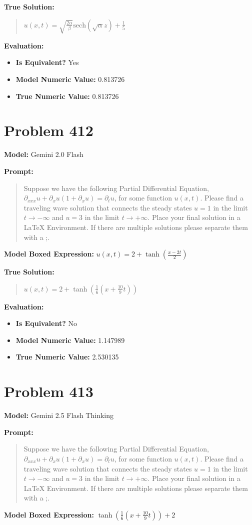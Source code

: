 \documentclass{article}
\begin{document}
\textbf{True Solution:}
\begin{quote}
$u(x,t) = \sqrt{\frac{2 \alpha}{\beta}}\text{sech}(\sqrt{\alpha} z) + \frac{1}{5}$
\end{quote}

\textbf{Evaluation:}
\begin{itemize}
\item \textbf{Is Equivalent?} Yes
\item \textbf{Model Numeric Value:} 0.813726
\item \textbf{True Numeric Value:} 0.813726
\end{itemize}
\vspace{1cm}
\section*{Problem 412}
\textbf{Model:} Gemini 2.0 Flash

\textbf{Prompt:}
\begin{quote}
Suppose we have the following Partial Differential Equation, $\partial_{xxx}u + \partial_xu(1+\partial_xu) = \partial_tu$, for some function $u(x,t)$. Please find a traveling wave solution that connects the steady states $u = 1$ in the limit $t \rightarrow -\infty $ and $u = 3$ in the limit $t \rightarrow +\infty$. Place your final solution in a $\boxed{}$ LaTeX Environment. If there are multiple solutions please separate them with a ;.
\end{quote}
\textbf{Model Boxed Expression:} $u(x,t) = 2 + \tanh\left(\frac{x - 2t}{2}\right)$

\textbf{True Solution:}
\begin{quote}
$u(x,t) = 2+\tanh(\frac{1}{6}(x+\frac{10}{9}t))$
\end{quote}

\textbf{Evaluation:}
\begin{itemize}
\item \textbf{Is Equivalent?} No
\item \textbf{Model Numeric Value:} 1.147989
\item \textbf{True Numeric Value:} 2.530135
\end{itemize}
\vspace{1cm}
\section*{Problem 413}
\textbf{Model:} Gemini 2.5 Flash Thinking

\textbf{Prompt:}
\begin{quote}
Suppose we have the following Partial Differential Equation, $\partial_{xxx}u + \partial_xu(1+\partial_xu) = \partial_tu$, for some function $u(x,t)$. Please find a traveling wave solution that connects the steady states $u = 1$ in the limit $t \rightarrow -\infty $ and $u = 3$ in the limit $t \rightarrow +\infty$. Place your final solution in a $\boxed{}$ LaTeX Environment. If there are multiple solutions please separate them with a ;.
\end{quote}
\textbf{Model Boxed Expression:} $\tanh\left(\frac{1}{6}\left(x+\frac{10}{9}t\right)\right)+2$
\end{document}
